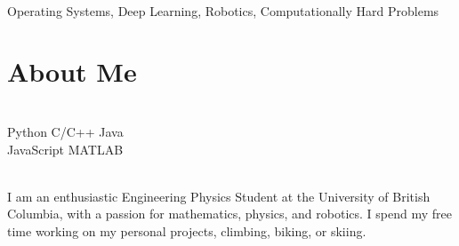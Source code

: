 \documentclass[]{deedy-resume-openfont}
\begin{document}
\begin{adjustwidth}{0.55cm}{1.25cm}
	 \\
	 Operating Systems, Deep Learning, Robotics, Computationally Hard Problems
\end{adjustwidth}

\vspace{10pt}

\section{About Me}
\begin{minipage}[t]{.35\textwidth}
	 \\
	Python \textbullet{} C/C++ \textbullet{} Java \\
	JavaScript \textbullet{} MATLAB
	\vspace{8pt}
\end{minipage}
\hfill
\begin{minipage}[t]{.55\textwidth}
	 \\
	I am an enthusiastic Engineering Physics Student at the University of British Columbia, with a passion for mathematics, physics, and robotics. I spend my free time working on my personal projects, climbing, biking, or skiing.
\end{minipage}
\end{document}
